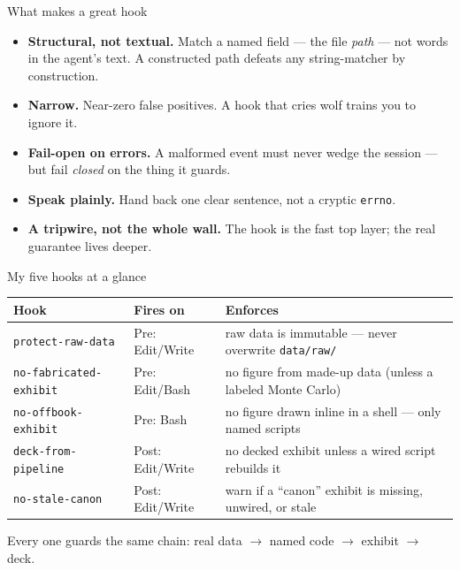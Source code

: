 \documentclass[aspectratio=169,11pt]{beamer}
\begin{document}
\begin{frame}{What makes a great hook}
\begin{itemize}\setlength\itemsep{0.28em}
    \item \textbf{Structural, not textual.} Match a named field --- the file \emph{path} --- not words in the agent's text. A constructed path defeats any string-matcher by construction.
    \item \textbf{Narrow.} Near-zero false positives. A hook that cries wolf trains you to ignore it.
    \item \textbf{Fail-open on errors.} A malformed event must never wedge the session --- but fail \emph{closed} on the thing it guards.
    \item \textbf{Speak plainly.} Hand back one clear sentence, not a cryptic \texttt{errno}.
    \item \textbf{A tripwire, not the whole wall.} The hook is the fast top layer; the real guarantee lives deeper.
\end{itemize}
\end{frame}

\begin{frame}{My five hooks at a glance}
\begin{center}
\footnotesize
\renewcommand{\arraystretch}{1.25}
\begin{tabular}{@{}llp{5.5cm}@{}}
\toprule
\textbf{Hook} & \textbf{Fires on} & \textbf{Enforces} \\
\midrule
\texttt{protect-raw-data} & Pre: Edit/Write & raw data is immutable --- never overwrite \texttt{data/raw/} \\
\texttt{no-fabricated-exhibit} & Pre: Edit/Bash & no figure from made-up data (unless a labeled Monte Carlo) \\
\texttt{no-offbook-exhibit} & Pre: Bash & no figure drawn inline in a shell --- only named scripts \\
\texttt{deck-from-pipeline} & Post: Edit/Write & no decked exhibit unless a wired script rebuilds it \\
\texttt{no-stale-canon} & Post: Edit/Write & warn if a ``canon'' exhibit is missing, unwired, or stale \\
\bottomrule
\end{tabular}
\end{center}
\vspace{0.25cm}
\alert{Every one guards the same chain: real data $\rightarrow$ named code $\rightarrow$ exhibit $\rightarrow$ deck.}
\end{frame}
\end{document}
